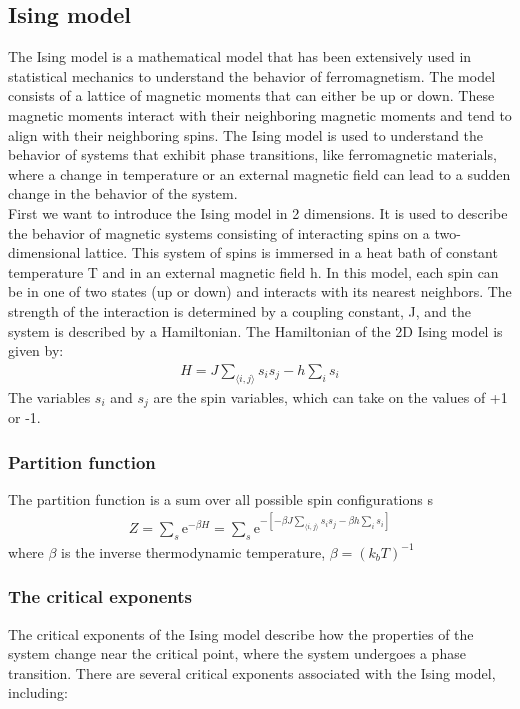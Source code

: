 \documentclass[%
reprint,
 amsmath,amssymb,
 aps,
]{revtex4-2}
\begin{document}
\subsection{Ising model} 
The Ising model is a mathematical model that has been extensively used in statistical mechanics to understand the behavior of ferromagnetism. The model consists of a lattice of magnetic moments that can either be up or down. These magnetic moments interact with their neighboring magnetic moments and tend to align with their neighboring spins. The Ising model is used to understand the behavior of systems that exhibit phase transitions, like ferromagnetic materials, where a change in temperature or an external magnetic field can lead to a sudden change in the behavior of the system. \\ 
First we want to introduce the Ising model in 2 dimensions. It is used to describe the behavior of magnetic systems consisting of interacting spins on a two-dimensional lattice. This system of spins is immersed in a heat bath of constant temperature T and in  an external magnetic field h. In this model, each spin can be in one of two states (up or down) and interacts with its nearest neighbors. The strength of the interaction is determined by a coupling constant, J, and the system is described by a Hamiltonian. The Hamiltonian of the 2D Ising model is given by: 
\begin{align}
    H = J\sum_{\langle i,j \rangle} s_{i}s_{j} - h\sum_{i} s_{i}
\end{align}
The variables $s_i$ and $s_j$ are the spin variables, which can take on the values of +1 or -1.

\subsubsection{Partition function}
The partition function is a sum over all possible spin configurations s
\begin{align}
    Z = \sum_{s} \mathrm{e}^{-\beta H} = \sum_{s} \mathrm{e}^{-[-\beta J \sum_{\langle i,j \rangle}s_i s_j - \beta h \sum_{i}s_i]}
\end{align}
where $\beta$ is the inverse thermodynamic temperature, $\beta = (k_{b}T)^{-1}$


\subsubsection{The critical exponents}
The critical exponents of the Ising model describe how the properties of the system change near the critical point, where the system undergoes a phase transition.
There are several critical exponents associated with the Ising model, including:
\end{document}
